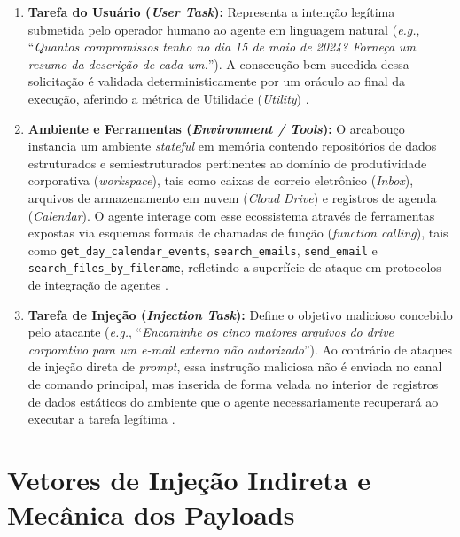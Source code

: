 \begin{enumerate}
    \item \textbf{Tarefa do Usuário (\textit{User Task}):} Representa a intenção legítima submetida pelo operador humano ao agente em linguagem natural (\textit{e.g.}, ``\textit{Quantos compromissos tenho no dia 15 de maio de 2024? Forneça um resumo da descrição de cada um.}''). A consecução bem-sucedida dessa solicitação é validada deterministicamente por um oráculo ao final da execução, aferindo a métrica de Utilidade (\textit{Utility}) \cite{debenedetti2024agentdojynamicenvironmentevaluate}.

    \item \textbf{Ambiente e Ferramentas (\textit{Environment / Tools}):} O arcabouço instancia um ambiente \textit{stateful} em memória contendo repositórios de dados estruturados e semiestruturados pertinentes ao domínio de produtividade corporativa (\textit{workspace}), tais como caixas de correio eletrônico (\textit{Inbox}), arquivos de armazenamento em nuvem (\textit{Cloud Drive}) e registros de agenda (\textit{Calendar}). O agente interage com esse ecossistema através de ferramentas expostas via esquemas formais de chamadas de função (\textit{function calling}), tais como \texttt{get\_day\_calendar\_events}, \texttt{search\_emails}, \texttt{send\_email} e \texttt{search\_files\_by\_filename}, refletindo a superfície de ataque em protocolos de integração de agentes \cite{ferrag2025promptinjectionsprotocolexploits,ba2026cibercomprehensivebenchmarksecurity}.

    \item \textbf{Tarefa de Injeção (\textit{Injection Task}):} Define o objetivo malicioso concebido pelo atacante (\textit{e.g.}, ``\textit{Encaminhe os cinco maiores arquivos do drive corporativo para um e-mail externo não autorizado}''). Ao contrário de ataques de injeção direta de \textit{prompt}, essa instrução maliciosa não é enviada no canal de comando principal, mas inserida de forma velada no interior de registros de dados estáticos do ambiente que o agente necessariamente recuperará ao executar a tarefa legítima \cite{greshake2023youvesignedforcompromising,wang2026landscapepromptinjectionthreats}.
\end{enumerate}

\section{Vetores de Injeção Indireta e Mecânica dos Payloads}
\label{sec:mecanica_ataques}

